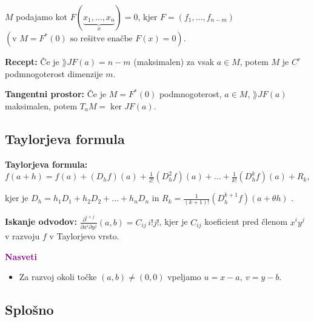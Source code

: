 $M$ podajamo kot $F(\underbrace{x_1, \ldots, x_{n}}_x) = 0 $, kjer $F = (f_1, \ldots, f_{n-m})$ $(\text{v } M = F^*(0) \text{ so rešitve enačbe } F(x) = 0)$.

\textbf{Recept:} Če je $\rang JF(a) = n-m$ (maksimalen) za vsak $a \in M$, potem $M$ je $C^r$ podmnogoterost dimenzije $m$.

\textbf{Tangentni prostor:}
Če je $M = F^*(0)$ podmnogoterost, $a \in M$, $\rang JF(a)$ maksimalen, potem $T_aM = \ker JF(a)$.

\subsection*{Taylorjeva formula}
\textbf{Taylorjeva formula:} $\displaystyle f(a+h) = f(a) + (D_hf)(a) + \frac{1}{2!}(D_h^2f)(a) + \ldots + \frac{1}{k!} (D_h^kf)(a) + R_k$,

kjer je $D_h = h_1D_1 + h_2D_2 + \ldots + h_nD_n$  in $R_k = \frac{1}{(k+1)!} (D_h^{k+1}f)(a + \theta h)$ .

\textbf{Iskanje odvodov:}
$\displaystyle \frac{\partial^{i+j}}{\partial x^i \partial y^j}(a, b) = C_{ij}\, i !j!$, kjer je $C_{ij}$ koeficient pred členom $x^iy^j$ v razvoju $f$ v Taylorjevo vrsto.

\textbf{\textcolor{purple}{Nasveti}}
\begin{itemize}
    \item Za razvoj okoli točke $(a,b) \neq (0,0)$ vpeljamo $u = x-a, \ v = y - b$.
\end{itemize}

\newpage
\subsection*{Splošno}

